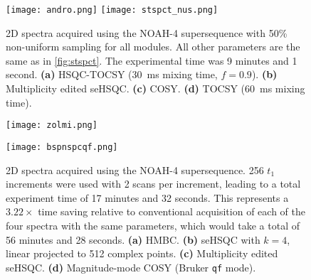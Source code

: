 \begin{figure}
    \centering
    \texttt{[image: andro.png]}\phantom{aaaaaa}
    \texttt{[image: stspct\_nus.png]}
    \caption{
        2D spectra acquired using the NOAH-4  supersequence with 50\% non-uniform sampling for all modules.
        All other parameters are the same as in \cref{fig:stspct}.
        The experimental time was 9 minutes and 1 second.
        \textbf{(a)} HSQC-TOCSY (\SI{30}{ms} mixing time, $f = 0.9$).
        \textbf{(b)} Multiplicity edited seHSQC.
        \textbf{(c)} COSY.
        \textbf{(d)} TOCSY (\SI{60}{ms} mixing time).
        \andro{}
    }
    \label{fig:stspct_nus}
\end{figure}

\begin{figure}
    \centering
    \texttt{[image: zolmi.png]}\phantom{aaaaaa}

    \texttt{[image: bspnspcqf.png]}
    \caption{
        2D spectra acquired using the NOAH-4  supersequence.
        256 $t_1$ increments were used with 2 scans per increment, leading to a total experiment time of 17 minutes and 32 seconds.
        This represents a $3.22\times$ time saving relative to conventional acquisition of each of the four spectra with the same parameters, which would take a total of 56 minutes and 28 seconds.
        \textbf{(a)} HMBC.
        \textbf{(b)} \nitrogen{} seHSQC with $k = 4$, linear projected to 512 complex points.
        \textbf{(c)} Multiplicity edited \carbon{} seHSQC.
        \textbf{(d)} Magnitude-mode COSY (Bruker \texttt{qf} mode).
        \zolmi{}
    }
    \label{fig:bspnspcqf}
\end{figure}
